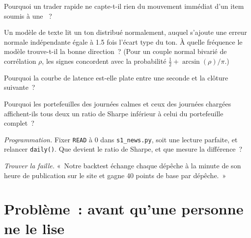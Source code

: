 \begin{exercise}[$\star$]\label{exo:s1:news-and-events:3}
Pourquoi un trader rapide ne capte-t-il rien du mouvement immédiat d'un item soumis à une ~?
\end{exercise}

\begin{exercise}[$\star\star$]\label{exo:s1:news-and-events:4}
Un modèle de texte lit un ton distribué normalement, auquel s'ajoute une erreur normale indépendante égale à 1.5 fois l'écart type du ton. À quelle fréquence le
modèle trouve-t-il la bonne direction~? (Pour un couple normal bivarié de corrélation $\rho$, les signes concordent avec la probabilité $\tfrac12 + \arcsin(\rho)/\pi$.)
\end{exercise}

\begin{exercise}[$\star\star$]\label{exo:s1:news-and-events:5}
Pourquoi la courbe de latence est-elle plate entre une seconde et la clôture suivante~?
\end{exercise}

\begin{exercise}[$\star\star$]\label{exo:s1:news-and-events:6}
Pourquoi les portefeuilles des journées calmes et ceux des journées chargées affichent-ils tous deux un ratio de Sharpe inférieur à celui du portefeuille complet~?
\end{exercise}

\begin{exercise}[$\star\star\star$]\label{exo:s1:news-and-events:7}
\emph{Programmation.} Fixer \texttt{READ} à 0 dans \texttt{s1\_news.py}, soit une lecture parfaite, et relancer \texttt{daily()}. Que devient le ratio de Sharpe, et que
mesure la différence~?
\end{exercise}

\begin{exercise}[$\star\star\star$]\label{exo:s1:news-and-events:8}
\emph{Trouver la faille.} «~Notre backtest échange chaque dépêche à la minute de son heure de publication sur le site et gagne 40 points de base par dépêche.~»
\end{exercise}

\section{Problème~: avant qu'une personne ne le lise}

